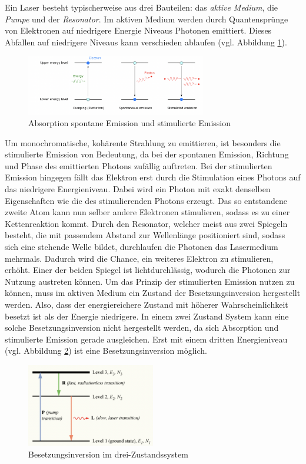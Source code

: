 Ein Laser besteht typischerweise aus drei Bauteilen: das \textit{aktive Medium}, die \textit{Pumpe} und der \textit{Resonator}.
Im aktiven Medium werden durch Quantensprünge von Elektronen auf niedrigere Energie Niveaus Photonen emittiert.
Dieses Abfallen auf niedrigere Niveaus kann verschieden ablaufen (vgl. Abbildung \ref{fig:emmision}).
\begin{figure}[h]
    \centering
    \includegraphics[width=0.7\textwidth]{abb/emission.png}
    \caption{Absorption spontane Emission und stimulierte Emission \cite{emission}}
    \label{fig:emmision}
\end{figure}
Um monochromatische, kohärente Strahlung zu emittieren, ist besonders die stimulierte Emission von Bedeutung,
da bei der spontanen Emission, Richtung und Phase des emittierten Photons zufällig auftreten.
Bei der stimulierten Emission hingegen fällt das Elektron erst durch die Stimulation eines Photons auf das niedrigere Energieniveau.
Dabei wird ein Photon mit exakt denselben Eigenschaften wie die des stimulierenden Photons erzeugt.
Das so entstandene zweite Atom kann nun selber andere Elektronen stimulieren,
sodass es zu einer Kettenreaktion kommt. 
Durch den Resonator, 
welcher meist aus zwei Spiegeln besteht,
die mit passendem Abstand zur Wellenlänge positioniert sind,
sodass sich eine stehende Welle bildet,
durchlaufen die Photonen das Lasermedium mehrmals.
Dadurch wird die Chance, ein weiteres Elektron zu stimulieren, erhöht. 
Einer der beiden Spiegel ist lichtdurchlässig, wodurch die Photonen zur Nutzung austreten können.
Um das Prinzip der stimulierten Emission nutzen zu können,
muss im aktiven Medium ein Zustand der Besetzungsinversion hergestellt werden.
Also, 
dass der energiereichere Zustand mit höherer Wahrscheinlichkeit besetzt ist als der Energie niedrigere.
In einem zwei Zustand System kann eine solche Besetzungsinversion nicht hergestellt werden,
da sich Absorption und stimulierte Emission gerade ausgleichen. 
Erst mit einem dritten Energieniveau (vgl. Abbildung \ref{fig:dreiniveau}) ist eine Besetzungsinversion möglich.
\begin{figure}[h]
    \centering
    \includegraphics[width=0.5\textwidth]{abb/dreiniveau.png}
    \caption{Besetzungsinversion im drei-Zustandssystem \cite{enwiki}}
    \label{fig:dreiniveau}
\end{figure}
